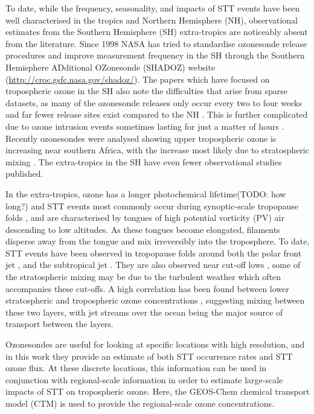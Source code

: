 \documentclass{article}
\begin{document}
    To date, while the frequency, seasonality, and impacts of STT events have been well characterised in the tropics and Northern Hemisphere (NH), observational estimates from the Southern Hemisphere (SH) extra-tropics are noticeably absent from the literature. 
    Since 1998 NASA has tried to standardise ozonesonde release procedures and improve measurement frequency in the SH through the Southern Hemisphere ADditional OZonesonde (SHADOZ) website (\url{http://croc.gsfc.nasa.gov/shadoz/}).
    The papers which have focused on tropospheric ozone in the SH also note the difficulties that arise from sparse datasets, as many of the ozonesonde releases only occur every two to four weeks and far fewer release sites exist compared to the NH \citep{Liu2015, Thompson2014, Mze2010}.
    This is further complicated due to ozone intrusion events sometimes lasting for just a matter of hours \citep{Tang2012}.
    Recently ozonesondes were analysed showing upper tropospheric ozone is increasing near southern Africa, with the increase most likely due to stratospheric mixing \citep{Liu2015, Thompson2014}. 
    The extra-tropics in the SH have even fewer observational studies published.
    
    In the extra-tropics, ozone has a longer photochemical lifetime(TODO: how long?) and STT events most commonly occur during synoptic-scale tropopause folds \citep{Sprenger2003, Tang2012}, and are characterised by tongues of high potential vorticity (PV) air descending to low altitudes.
    As these tongues become elongated, filaments disperse away from the tongue and mix irreversibly into the troposphere.
    To date, STT events have been observed in tropopause folds around both the polar front jet \citep{Vaughan1994, Beekmann1997}, and the subtropical jet \citep{Baray2000}.
    They are also observed near cut-off lows \citep{Price1993, Wirth1995}, some of the stratospheric mixing may be due to the turbulent weather which often accompanies these cut-offs.
    A high correlation has been found between lower stratospheric and tropospheric ozone concentrations \citep{Terao2008}, suggesting mixing between these two layers, with jet streams over the ocean being the major source of transport between the layers.
    
    Ozonesondes are useful for looking at specific locations with high resolution, and in this work they provide an estimate of both STT occurrence rates and STT ozone flux.
    At these discrete locations, this information can be used in conjunction with regional-scale information in order to estimate large-scale impacts of STT on tropospheric ozone. Here, the 
    GEOS-Chem chemical transport model (CTM) is used to provide the regional-scale ozone concentrations.
  
\end{document}
